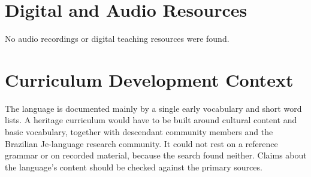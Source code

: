 \documentclass[12pt]{article}
\begin{document}
\section{Digital and Audio Resources}
No audio recordings or digital teaching resources were found.

\section{Curriculum Development Context}
The language is documented mainly by a single early vocabulary and short word lists. A heritage curriculum would have to be built around cultural content and basic vocabulary, together with descendant community members and the Brazilian Je-language research community. It could not rest on a reference grammar or on recorded material, because the search found neither. Claims about the language's content should be checked against the primary sources.
\end{document}
